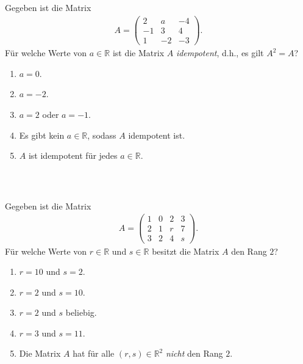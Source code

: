 \subsection*{}
Gegeben ist die Matrix
\begin{align*}
	A
	=
	\begin{pmatrix}
		2 & a & -4 \\
		-1 & 3 & 4\\
		1 & -2 & -3
	\end{pmatrix}.
\end{align*}
Für welche Werte von $ a \in \mathbb{R} $ ist die Matrix $ A $
\textit{idempotent}, d.h., es gilt $ A^2 = A $?
\renewcommand{\labelenumi}{(\alph{enumi})}
\begin{enumerate}
\item 
$ a= 0 $.
\item 
$ a= -2 $.
\item
$ a= 2 $ oder $ a= -1 $.
\item
Es gibt kein $ a \in \mathbb{R} $, sodass $ A $ idempotent ist.
\item
$ A $ ist idempotent für jedes $ a \in \mathbb{R} $.
\end{enumerate}
\ \\
\subsection*{}
Gegeben ist die Matrix
\begin{align*}
	A =
	\begin{pmatrix}
		1 & 0 & 2 & 3 \\
		2 & 1 & r & 7 \\
		3 & 2 & 4 &  s 
	\end{pmatrix}.
\end{align*}
Für welche Werte von $ r \in \mathbb{R} $ und $ s \in \mathbb{R} $ besitzt die Matrix $ A $ den Rang $ 2 $?
\renewcommand{\labelenumi}{(\alph{enumi})}
\begin{enumerate}
	\item 
	$ r = 10 $ und $ s = 2 $.
	\item 
	$ r =  2 $ und $ s = 10 $.
	\item
	$ r = 2 $ und $ s $ beliebig.
	\item
	$ r = 3 $ und $ s = 11 $.
	\item
	Die Matrix $ A $ hat für alle $ (r,s) \in \mathbb{R}^2 $ \textit{nicht} den Rang $ 2 $.
\end{enumerate}
\ \\
\newpage
